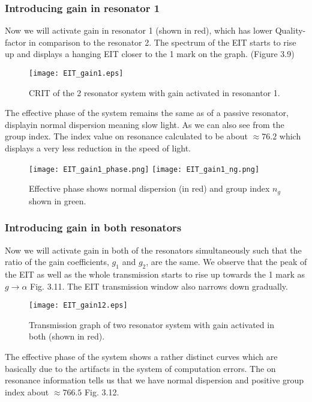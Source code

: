 \subsubsection{Introducing gain in resonator 1}
Now we will activate gain in resonator 1 (shown in red), which has lower Quality-factor in comparison to the resonator 2. The spectrum of the EIT starts to rise up and displays a hanging EIT closer to the 1 mark on the graph. (Figure 3.9)

\begin{figure}[h]
\centering
\texttt{[image: EIT\_gain1.eps]}
\caption{CRIT of the 2 resonator system with gain activated in resonantor 1.}
\end{figure}

The effective phase of the system remains the same as of a passive resonator, displayin normal dispersion meaning slow light. As we can also see from the group index. The index value on resonance calculated to be about $\approx 76.2$ which displays a very less reduction in the speed of light. 

\begin{figure}[h]
\texttt{[image: EIT\_gain1\_phase.png]}
\texttt{[image: EIT\_gain1\_ng.png]}
\caption{Effective phase shows normal dispersion (in red) and group index $n_{g}$ shown in green.}
\end{figure}


\subsubsection{Introducing gain in both resonators}
Now we will activate gain in both of the resonators simultaneously such that the ratio of the gain coefficients, $g_{1}$ and $g_{2}$, are the same. 
We observe that the peak of the EIT as well as the whole transmission starts to rise up towards the 1 mark as $g \to \alpha$ Fig. 3.11. The EIT transmission window also narrows down gradually.

\begin{figure}[h]
\centering
\texttt{[image: EIT\_gain12.eps]}
\caption{Transmission graph of two resonator system with gain activated in both (shown in red).}
\end{figure}

The effective phase of the system shows a rather distinct curves which are basically due to the artifacts in the system of computation errors. The on resonance information tells us that we have normal dispersion and positive group index about $\approx 766.5$ Fig. 3.12. 

